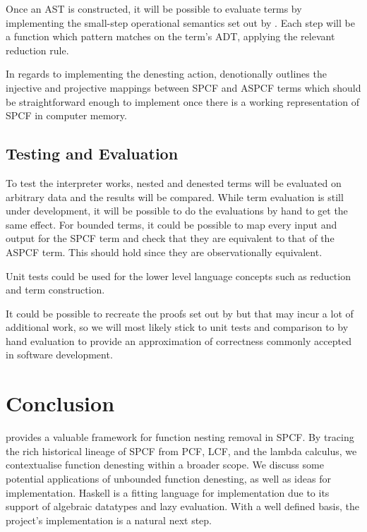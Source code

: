 \documentclass[12pt,a4paper]{report}
\theoremstyle{definition}
\theoremstyle{remark}
\begin{document}
Once an AST is constructed, it will be possible to evaluate terms by implementing the small-step operational semantics set out by \cite{laird_2007}. Each step will be a function which pattern matches on the term's ADT, applying the relevant reduction rule.

In regards to implementing the denesting action, \cite{laird_2007} denotionally outlines the injective and projective mappings between SPCF and ASPCF terms which should be straightforward enough to implement once there is a working representation of SPCF in computer memory. 

\subsection{Testing and Evaluation}
To test the interpreter works, nested and denested terms will be evaluated on arbitrary data and the results will be compared. While term evaluation is still under development, it will be possible to do the evaluations by hand to get the same effect. For bounded terms, it could be possible to map every input and output for the SPCF term and check that they are equivalent to that of the ASPCF term. This should hold since they are observationally equivalent. 

Unit tests could be used for the lower level language concepts such as reduction and term construction.

It could be possible to recreate the proofs set out by \cite{laird_2007} but that may incur a lot of additional work, so we will most likely stick to unit tests and comparison to by hand evaluation to provide an approximation of correctness commonly accepted in software development.

\section{Conclusion}
\cite{laird_2007} provides a valuable framework for function nesting removal in SPCF. By tracing the rich historical lineage of SPCF from PCF, LCF, and the lambda calculus, we contextualise function denesting within a broader scope. We discuss some potential applications of unbounded function denesting, as well as ideas for implementation. Haskell is a fitting language for implementation due to its support of algebraic datatypes and lazy evaluation. With a well defined basis, the project's implementation is a natural next step.

\end{document}
